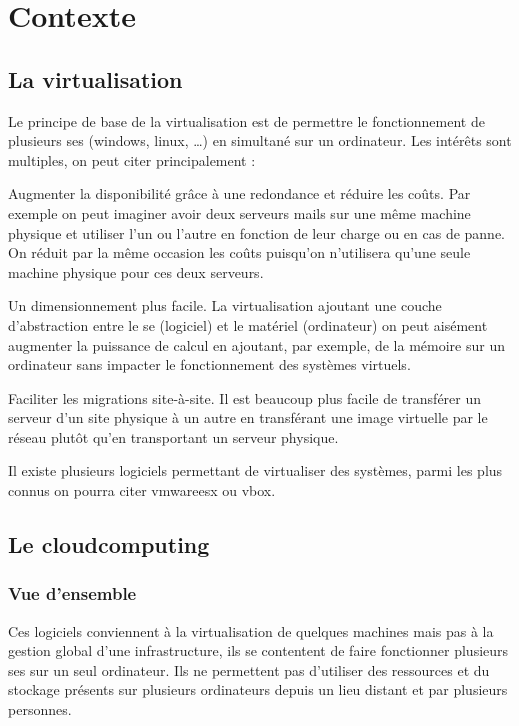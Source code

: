 \documentclass[a4paper,oneside]{report}
\begin{document}
\section{Contexte}
\subsection{La \gls{virtualisation}}
Le principe de base de la \gls{virtualisation} est de permettre le fonctionnement de plusieurs \glspl{se} (\gls{windows}, \gls{linux}, …) en simultané sur un ordinateur.
Les intérêts sont multiples, on peut citer principalement :\newline

Augmenter la disponibilité grâce à une redondance et réduire les coûts.
Par exemple on peut imaginer avoir deux serveurs mails sur une même machine physique et utiliser l’un ou l’autre en fonction de leur charge ou en cas de panne.
On réduit par la même occasion les coûts puisqu’on n’utilisera qu’une seule machine physique pour ces deux serveurs.

Un dimensionnement plus facile. La \gls{virtualisation} ajoutant une couche d’abstraction entre le \gls{se} (logiciel) et le matériel (ordinateur) on peut aisément augmenter la puissance de calcul en ajoutant, par exemple, de la mémoire sur un ordinateur sans impacter le fonctionnement des systèmes virtuels.

Faciliter les migrations site-à-site.
Il est beaucoup plus facile de transférer un serveur d’un site physique à un autre en transférant une image virtuelle par le réseau plutôt qu’en transportant un serveur physique.\newline

Il existe plusieurs logiciels permettant de virtualiser des systèmes, parmi les plus connus on pourra citer \gls{vmwareesx} ou \gls{vbox}.

\subsection{Le \gls{cloudcomputing}}
\subsubsection{Vue d'ensemble}
Ces logiciels conviennent à la \gls{virtualisation} de quelques machines mais pas à la gestion global d'une infrastructure, ils se contentent de faire fonctionner plusieurs \glspl{se} sur un seul ordinateur.
Ils ne permettent pas d'utiliser des ressources et du stockage présents sur plusieurs ordinateurs depuis un lieu distant et par plusieurs personnes.
\end{document}

